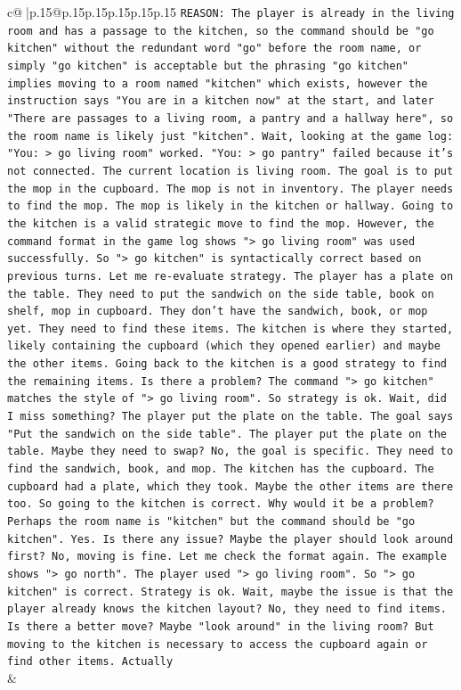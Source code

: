 \documentclass{article}
\begin{document}
{\begin{supertabular}{c@{$\;$}|p{.15\linewidth}@{}p{.15\linewidth}p{.15\linewidth}p{.15\linewidth}p{.15\linewidth}p{.15\linewidth}}
{{{\texttt{REASON: The player is already in the living room and has a passage to the kitchen, so the command should be "go kitchen" without the redundant word "go" before the room name, or simply "go kitchen" is acceptable but the phrasing "go kitchen" implies moving to a room named "kitchen" which exists, however the instruction says "You are in a kitchen now" at the start, and later "There are passages to a living room, a pantry and a hallway here", so the room name is likely just "kitchen". Wait, looking at the game log: "You: > go living room" worked. "You: > go pantry" failed because it's not connected. The current location is living room. The goal is to put the mop in the cupboard. The mop is not in inventory. The player needs to find the mop. The mop is likely in the kitchen or hallway. Going to the kitchen is a valid strategic move to find the mop. However, the command format in the game log shows "> go living room" was used successfully. So "> go kitchen" is syntactically correct based on previous turns. Let me re{-}evaluate strategy. The player has a plate on the table. They need to put the sandwich on the side table, book on shelf, mop in cupboard. They don't have the sandwich, book, or mop yet. They need to find these items. The kitchen is where they started, likely containing the cupboard (which they opened earlier) and maybe the other items. Going back to the kitchen is a good strategy to find the remaining items. Is there a problem? The command "> go kitchen" matches the style of "> go living room". So strategy is ok. Wait, did I miss something? The player put the plate on the table. The goal says "Put the sandwich on the side table". The player put the plate on the table. Maybe they need to swap? No, the goal is specific. They need to find the sandwich, book, and mop. The kitchen has the cupboard. The cupboard had a plate, which they took. Maybe the other items are there too. So going to the kitchen is correct. Why would it be a problem? Perhaps the room name is "kitchen" but the command should be "go kitchen". Yes. Is there any issue? Maybe the player should look around first? No, moving is fine. Let me check the format again. The example shows "> go north". The player used "> go living room". So "> go kitchen" is correct. Strategy is ok. Wait, maybe the issue is that the player already knows the kitchen layout? No, they need to find items. Is there a better move? Maybe "look around" in the living room? But moving to the kitchen is necessary to access the cupboard again or find other items. Actually} \\
            }
        }
    }
    & \\ \\


\end{supertabular}}
\end{document}

